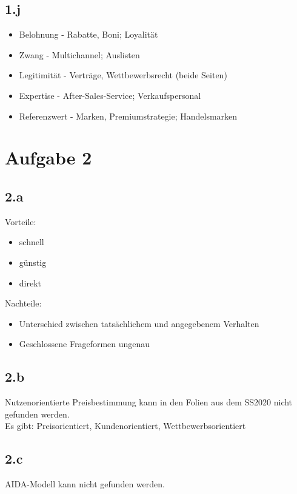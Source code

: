 \subsection*{1.j}
    \begin{itemize}
        \item Belohnung - Rabatte, Boni; Loyalität
        \item Zwang - Multichannel; Auslisten
        \item Legitimität - Verträge, Wettbewerbsrecht (beide Seiten)
        \item Expertise - After-Sales-Service; Verkaufspersonal
        \item Referenzwert - Marken, Premiumstrategie; Handelsmarken
    \end{itemize}



\section*{Aufgabe 2}
\subsection*{2.a}
    Vorteile:
    \begin{itemize}
        \item schnell
        \item günstig
        \item direkt
    \end{itemize}

    Nachteile:
    \begin{itemize}
        \item Unterschied zwischen tatsächlichem und angegebenem Verhalten
        \item Geschlossene Frageformen ungenau
    \end{itemize}

\subsection*{2.b}
    Nutzenorientierte Preisbestimmung kann in den Folien aus dem SS2020 nicht gefunden werden. \\
    Es gibt: Preisorientiert, Kundenorientiert, Wettbewerbsorientiert

\subsection*{2.c}
    AIDA-Modell kann nicht gefunden werden.

